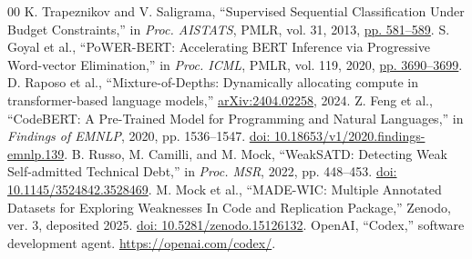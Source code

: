 \documentclass[10pt,conference]{IEEEtran}
\begin{document}
\begin{thebibliography}{00}
 K. Trapeznikov and V. Saligrama, ``Supervised Sequential Classification Under Budget Constraints,'' in \emph{Proc. AISTATS}, PMLR, vol. 31, 2013, \href{https://proceedings.mlr.press/v31/trapeznikov13a.html}{pp. 581--589}.
 S. Goyal et al., ``PoWER-BERT: Accelerating BERT Inference via Progressive Word-vector Elimination,'' in \emph{Proc. ICML}, PMLR, vol. 119, 2020, \href{https://proceedings.mlr.press/v119/goyal20a.html}{pp. 3690--3699}.
 D. Raposo et al., ``Mixture-of-Depths: Dynamically allocating compute in transformer-based language models,'' \href{https://arxiv.org/abs/2404.02258}{arXiv:2404.02258}, 2024.
 Z. Feng et al., ``CodeBERT: A Pre-Trained Model for Programming and Natural Languages,'' in \emph{Findings of EMNLP}, 2020, pp. 1536--1547. \href{https://aclanthology.org/2020.findings-emnlp.139/}{doi: \mbox{10.18653/v1/2020.findings-emnlp.139}}.
 B. Russo, M. Camilli, and M. Mock, ``WeakSATD: Detecting Weak Self-admitted Technical Debt,'' in \emph{Proc. MSR}, 2022, pp. 448--453. \href{https://re.public.polimi.it/retrieve/89e31863-1e03-4233-b575-22e449dc4d22/3524842.3528469.pdf}{doi: \mbox{10.1145/3524842.3528469}}.
 M. Mock et al., ``MADE-WIC: Multiple Annotated Datasets for Exploring Weaknesses In Code and Replication Package,'' Zenodo, ver. 3, deposited 2025. \href{https://zenodo.org/records/15126132}{doi: \mbox{10.5281/zenodo.15126132}}.
 OpenAI, ``Codex,'' software development agent. \url{https://openai.com/codex/}.
\end{thebibliography}
\end{document}
